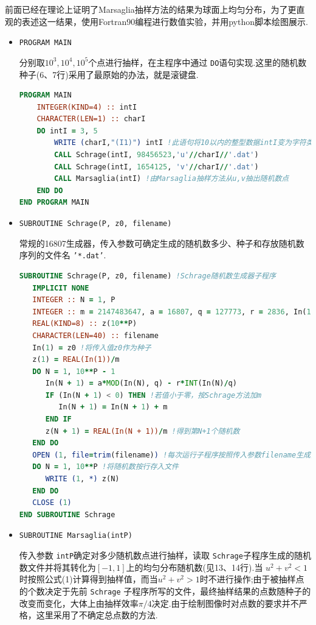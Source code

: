 \documentclass[12pt,a4paper,utf8]{ctexart}
\begin{document}
前面已经在理论上证明了Marsaglia抽样方法的结果为球面上均匀分布，为了更直观的表述这一结果，使用Fortran90编程进行数值实验，并用python脚本绘图展示.
\begin{itemize}
    \item \texttt{PROGRAM MAIN}
    
    分别取$10^3,10^4,10^5$个点进行抽样，在主程序中通过
    \texttt{DO}语句实现.这里的随机数种子(6、7行)采用了最原始的办法，就是滚键盘.

\begin{framed}
\begin{lstlisting}[language=Fortran]
PROGRAM MAIN
    INTEGER(KIND=4) :: intI
    CHARACTER(LEN=1) :: charI
    DO intI = 3, 5
        WRITE (charI,"(I1)") intI !此语句将10以内的整型数据intI变为字符类型charI
        CALL Schrage(intI, 98456523,'u'//charI//'.dat')
        CALL Schrage(intI, 1654125, 'v'//charI//'.dat')
        CALL Marsaglia(intI) !由Marsaglia抽样方法从u,v抽出随机数点
    END DO
END PROGRAM MAIN
\end{lstlisting}
\end{framed}

\item \texttt{SUBROUTINE Schrage(P, z0, filename)}

    常规的16807生成器，传入参数可确定生成的随机数多少、种子和存放随机数序列的文件名
    \texttt{'*.dat'}.

\begin{framed}
\begin{lstlisting}[language=Fortran]
SUBROUTINE Schrage(P, z0, filename) !Schrage随机数生成器子程序
   IMPLICIT NONE
   INTEGER :: N = 1, P
   INTEGER :: m = 2147483647, a = 16807, q = 127773, r = 2836, In(10**P), z0
   REAL(KIND=8) :: z(10**P)
   CHARACTER(LEN=40) :: filename
   In(1) = z0 !将传入值z0作为种子
   z(1) = REAL(In(1))/m
   DO N = 1, 10**P - 1
      In(N + 1) = a*MOD(In(N), q) - r*INT(In(N)/q)
      IF (In(N + 1) < 0) THEN !若值小于零，按Schrage方法加m
         In(N + 1) = In(N + 1) + m
      END IF
      z(N + 1) = REAL(In(N + 1))/m !得到第N+1个随机数
   END DO
   OPEN (1, file=trim(filename)) !每次运行子程序按照传入参数filename生成数据文件
   DO N = 1, 10**P !将随机数按行存入文件
      WRITE (1, *) z(N)
   END DO
   CLOSE (1)
END SUBROUTINE Schrage
\end{lstlisting}
\end{framed}

\item \texttt{SUBROUTINE Marsaglia(intP)}

    传入参数 \texttt{intP}确定对多少随机数点进行抽样，读取
    \texttt{Schrage}子程序生成的随机数文件并将其转化为$[-1,1]$上的均匀分布随机数(见13、14行).当
    $u^2+v^2 <
    1$时按照公式(1)计算得到抽样值，而当$u^2+v^2>1$时不进行操作;由于被抽样点的个数决定于先前
    \texttt{Schrage}
    子程序所写的文件，最终抽样结果的点数随种子的改变而变化，大体上由抽样效率$\pi/4$决定.由于绘制图像时对点数的要求并不严格，这里采用了不确定总点数的方法.


\end{itemize}
\end{document}
